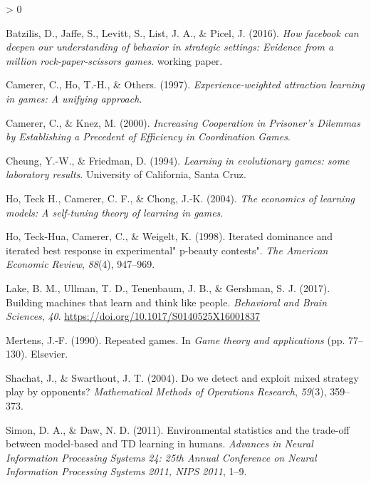 \documentclass[
  english,
  man,floatsintext]{apa6}
\newlength{\cslhangindent}
\newenvironment{CSLReferences}[2] %
 {%
  \setlength{\parindent}{0pt}
  \ifodd #1 \everypar{\setlength{\hangindent}{\cslhangindent}}\ignorespaces\fi
  \ifnum #2 > 0
  \setlength{\parskip}{#2\baselineskip}
  \fi
 }%
 {}
\begin{document}
\hypertarget{refs}{}
\begin{CSLReferences}{1}{0}
\leavevmode\hypertarget{ref-batzilis}{}%
Batzilis, D., Jaffe, S., Levitt, S., List, J. A., \& Picel, J. (2016). \emph{How facebook can deepen our understanding of behavior in strategic settings: Evidence from a million rock-paper-scissors games}. working paper.

\leavevmode\hypertarget{ref-camerer1997experience}{}%
Camerer, C., Ho, T.-H., \& Others. (1997). \emph{{Experience-weighted attraction learning in games: A unifying approach}}.

\leavevmode\hypertarget{ref-knez2000}{}%
Camerer, C., \& Knez, M. (2000). \emph{{Increasing Cooperation in Prisoner's Dilemmas by Establishing a Precedent of Efficiency in Coordination Games}}.

\leavevmode\hypertarget{ref-cheung1994learning}{}%
Cheung, Y.-W., \& Friedman, D. (1994). \emph{{Learning in evolutionary games: some laboratory results}}. University of California, Santa Cruz.

\leavevmode\hypertarget{ref-ho2004economics}{}%
Ho, Teck H., Camerer, C. F., \& Chong, J.-K. (2004). \emph{{The economics of learning models: A self-tuning theory of learning in games}}.

\leavevmode\hypertarget{ref-ho1998iterated}{}%
Ho, Teck-Hua, Camerer, C., \& Weigelt, K. (1998). {Iterated dominance and iterated best response in experimental" p-beauty contests"}. \emph{The American Economic Review}, \emph{88}(4), 947--969.

\leavevmode\hypertarget{ref-Lake2017}{}%
Lake, B. M., Ullman, T. D., Tenenbaum, J. B., \& Gershman, S. J. (2017). {Building machines that learn and think like people}. \emph{Behavioral and Brain Sciences}, \emph{40}. \url{https://doi.org/10.1017/S0140525X16001837}

\leavevmode\hypertarget{ref-mertens1990repeated}{}%
Mertens, J.-F. (1990). {Repeated games}. In \emph{Game theory and applications} (pp. 77--130). Elsevier.

\leavevmode\hypertarget{ref-shachat2004we}{}%
Shachat, J., \& Swarthout, J. T. (2004). {Do we detect and exploit mixed strategy play by opponents?} \emph{Mathematical Methods of Operations Research}, \emph{59}(3), 359--373.

\leavevmode\hypertarget{ref-Simon_Daw_11}{}%
Simon, D. A., \& Daw, N. D. (2011). {Environmental statistics and the trade-off between model-based and TD learning in humans}. \emph{Advances in Neural Information Processing Systems 24: 25th Annual Conference on Neural Information Processing Systems 2011, NIPS 2011}, 1--9.


\end{CSLReferences}
\end{document}

